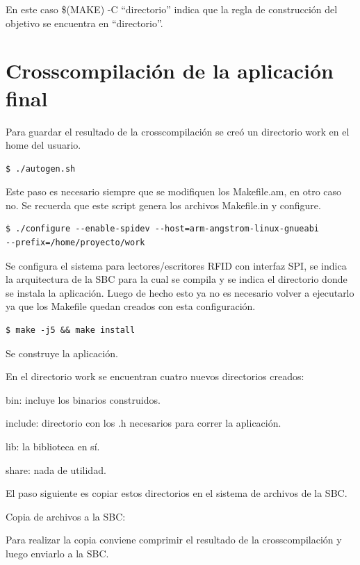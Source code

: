 \bigskip
En este caso \$(MAKE) -C “directorio” indica que la regla de construcción del objetivo se encuentra en “directorio”.

\section{Crosscompilación de la aplicación final}\label{crosap}

Para guardar el resultado de la crosscompilación se creó un directorio work en el home del usuario.

\bigskip
\begin{verbatim}
$ ./autogen.sh
\end{verbatim}

Este paso es necesario siempre que se modifiquen los Makefile.am, en otro caso no. Se recuerda que este script genera los archivos Makefile.in y configure.

\bigskip
\begin{verbatim}
$ ./configure --enable-spidev --host=arm-angstrom-linux-gnueabi 
--prefix=/home/proyecto/work
\end{verbatim}

\bigskip
Se configura el sistema para lectores/escritores RFID con interfaz SPI, se indica la arquitectura de la SBC para la cual se compila y se indica el directorio donde se instala la aplicación. Luego de hecho esto ya no es necesario volver a ejecutarlo ya que los Makefile quedan creados con esta configuración.

\bigskip
\begin{verbatim}
$ make -j5 && make install
\end{verbatim}

Se construye la aplicación.

\bigskip
En el directorio work se encuentran cuatro nuevos directorios creados:

\bigskip
bin: incluye los binarios construidos.

include: directorio con los .h necesarios para correr la aplicación.

lib: la biblioteca en sí.

share: nada de utilidad.

\bigskip
El paso siguiente es copiar estos directorios en el sistema de archivos de la SBC.

\bigskip
Copia de archivos a la SBC:

\bigskip
Para realizar la copia conviene comprimir el resultado de la crosscompilación y luego enviarlo a la SBC.

